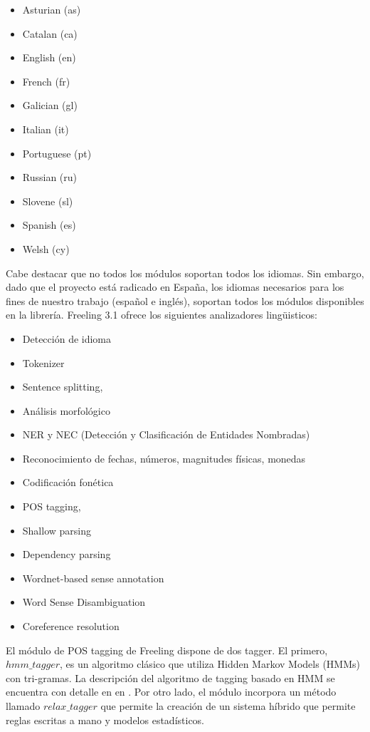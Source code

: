 \begin{itemize}
\item Asturian (as)
\item Catalan (ca) 
\item English (en)
\item French (fr) 
\item Galician (gl)
\item Italian (it)
\item Portuguese (pt)
\item Russian (ru)
\item Slovene (sl)
\item Spanish (es)
\item Welsh (cy)
\end{itemize}

Cabe destacar que no todos los m\'odulos soportan todos los idiomas. Sin embargo, dado que el proyecto está radicado en Espa\~na,
los idiomas necesarios para los fines de nuestro trabajo (espa\~nol e inglés), soportan todos los m\'odulos disponibles
en la librería.
Freeling 3.1 ofrece los siguientes analizadores lingüisticos:

\begin{itemize}
\item Detecci\'on de idioma
\item Tokenizer
\item Sentence splitting,
\item Análisis morfol\'ogico
\item NER y NEC (Detecci\'on y Clasificaci\'on de Entidades Nombradas)
\item Reconocimiento de fechas, números, magnitudes físicas, monedas
\item Codificaci\'on fonética
\item POS tagging, 
\item Shallow parsing
\item Dependency parsing
\item Wordnet-based sense annotation
\item Word Sense Disambiguation
\item Coreference resolution
\end{itemize}


El módulo de POS tagging de Freeling dispone de dos tagger. El primero, $hmm\_tagger$, es un algoritmo clásico que utiliza Hidden Markov Models (HMMs) con tri-gramas. La descripción del algoritmo de tagging basado en HMM se encuentra con detalle en  en \cite{POS0}. Por otro lado, el módulo incorpora un método llamado $relax\_tagger$ que permite la creación de un sistema híbrido que permite reglas escritas a mano y modelos estadísticos. 


